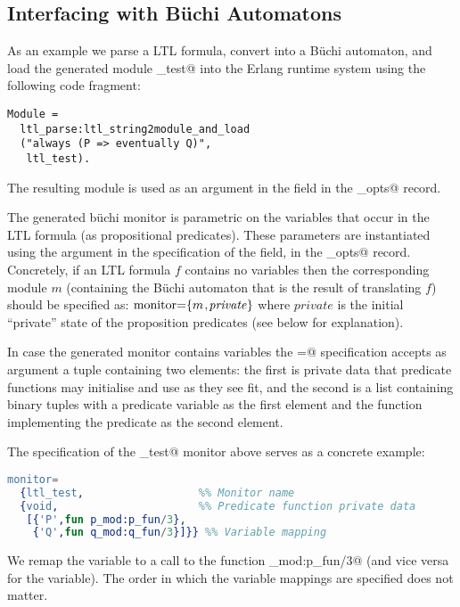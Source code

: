 \documentclass[a4paper]{article}
\begin{document}
\subsection{Interfacing with B\"uchi Automatons}
As an example we parse a LTL formula, convert into a B\"uchi automaton,
and load the generated module \lstinline@ltl_test@
into the Erlang runtime system
using the following code fragment:
\begin{lstlisting}
Module = 
  ltl_parse:ltl_string2module_and_load
  ("always (P => eventually Q)", 
   ltl_test).
\end{lstlisting}

The resulting module is used as an argument in the \lstinline@monitor@ field
in the \lstinline@mce_opts@ record. 

The generated b\"uchi monitor is parametric on the 
variables that occur in the LTL formula (as propositional predicates). 
These parameters are instantiated using the argument in the 
specification of the \lstinline@monitor@ field, in the 
\lstinline@mce_opts@ record. Concretely, if an LTL formula $f$
contains no variables then the corresponding module $m$
(containing the B\"uchi automaton that is the result of translating $f$)
should be specified as:
$\mbox{\lstinline@monitor=\{@}m\mbox{\lstinline@,@}\mathit{private}
 \mbox{\lstinline@\}@}$
where $\mathit{private}$ is the initial ``private'' state of
the proposition predicates (see below for explanation).

In case the generated monitor contains variables
the \lstinline@monitor=@ specification accepts as argument
a tuple containing two elements:
the first is private data that predicate functions may initialise
and use as they see fit, and the second 
is a list containing binary tuples with a predicate variable
as the first element and the function implementing
the predicate as the second element.

The specification of the \lstinline@ltl_test@ monitor above serves
as a concrete example:
\begin{lstlisting}[language=Erlang]
monitor=
  {ltl_test,                  %% Monitor name
  {void,                      %% Predicate function private data
   [{'P',fun p_mod:p_fun/3},
    {'Q',fun q_mod:q_fun/3}]}} %% Variable mapping
\end{lstlisting}
We remap the \lstinline@P@ variable to a call to 
the function \lstinline@p_mod:p_fun/3@ (and vice versa for 
the \lstinline@Q@ variable). The order in which the variable
mappings are specified does not matter.
\end{document}
